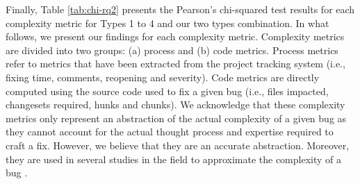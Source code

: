 Finally, Table \ref{tab:chi-rq2} presents the Pearson's chi-squared test
results for each complexity metric for Types 1 to 4 and our two types
combination. In what follows, we present our findings for each
complexity metric. Complexity metrics are divided into two groups: (a)
process and (b) code metrics. Process metrics refer to metrics that have
been extracted from the project tracking system (i.e., fixing time,
comments, reopening and severity). Code metrics are directly computed
using the source code used to fix a given bug (i.e., files impacted,
changesets required, hunks and chunks). We acknowledge that these
complexity metrics only represent an abstraction of the actual
complexity of a given bug as they cannot account for the actual thought
process and expertise required to craft a fix. However, we believe that
they are an accurate abstraction. Moreover, they are used in several
studies in the field to approximate the complexity of a bug
\cite{Weiß2007,Saha2014,Nam2013,Anvik2006,Nagappan}.


